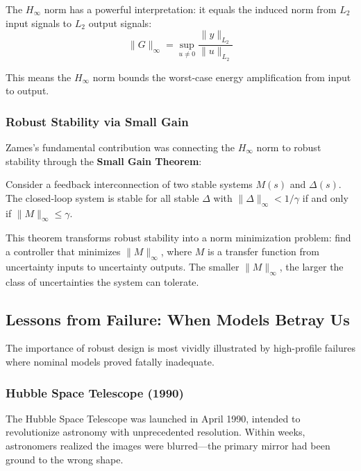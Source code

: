 The $H_\infty$ norm has a powerful interpretation: it equals the induced norm from $L_2$ input signals to $L_2$ output signals:
\begin{equation}
\|G\|_\infty = \sup_{u \neq 0} \frac{\|y\|_{L_2}}{\|u\|_{L_2}}
\label{eq:hinf_induced}
\end{equation}

This means the $H_\infty$ norm bounds the worst-case energy amplification from input to output.

\subsubsection{Robust Stability via Small Gain}

Zames's fundamental contribution was connecting the $H_\infty$ norm to robust stability through the \textbf{Small Gain Theorem}:

\begin{theorem}
Consider a feedback interconnection of two stable systems $M(s)$ and $\Delta(s)$. The closed-loop system is stable for all stable $\Delta$ with $\|\Delta\|_\infty < 1/\gamma$ if and only if $\|M\|_\infty \leq \gamma$.
\end{theorem}

This theorem transforms robust stability into a norm minimization problem: find a controller that minimizes $\|M\|_\infty$, where $M$ is a transfer function from uncertainty inputs to uncertainty outputs. The smaller $\|M\|_\infty$, the larger the class of uncertainties the system can tolerate.

\subsection{Lessons from Failure: When Models Betray Us}
\label{subsec:failures}

The importance of robust design is most vividly illustrated by high-profile failures where nominal models proved fatally inadequate.

\subsubsection{Hubble Space Telescope (1990)}

The Hubble Space Telescope was launched in April 1990, intended to revolutionize astronomy with unprecedented resolution. Within weeks, astronomers realized the images were blurred---the primary mirror had been ground to the wrong shape.

